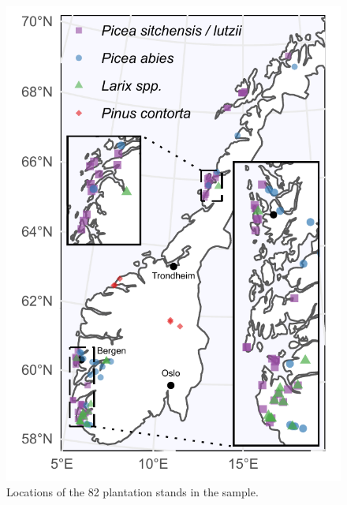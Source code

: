 \documentclass[
]{article}
\begin{document}
\begin{figure}
\includegraphics[width=1\linewidth]{figures/sites-map} \caption{Locations of the 82 plantation stands in the sample.}\label{fig:sites-map}
\end{figure}
\end{document}
